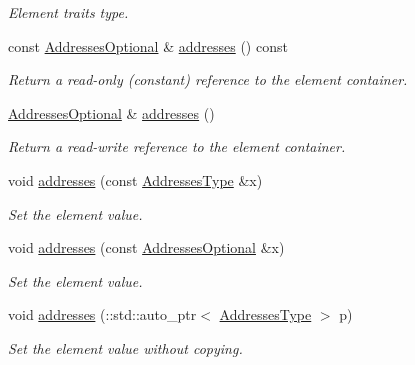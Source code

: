 \begin{DoxyCompactItemize}
\begin{DoxyCompactList}\small\item\em Element traits type. \item\end{DoxyCompactList}\item 
const \hyperlink{classopenstack_1_1xml_1_1Server_a61bfe22398061981e800f13759059fbd}{AddressesOptional} \& \hyperlink{classopenstack_1_1xml_1_1Server_a2897d8f0fab9ce57c3391f06630b902d}{addresses} () const 
\begin{DoxyCompactList}\small\item\em Return a read-\/only (constant) reference to the element container. \item\end{DoxyCompactList}\item 
\hyperlink{classopenstack_1_1xml_1_1Server_a61bfe22398061981e800f13759059fbd}{AddressesOptional} \& \hyperlink{classopenstack_1_1xml_1_1Server_a9bdb27c2a96816f796dd0ad062ff2ef4}{addresses} ()
\begin{DoxyCompactList}\small\item\em Return a read-\/write reference to the element container. \item\end{DoxyCompactList}\item 
void \hyperlink{classopenstack_1_1xml_1_1Server_a7a0485704e1c25798b0ced61a8b61448}{addresses} (const \hyperlink{classopenstack_1_1xml_1_1Addresses}{AddressesType} \&x)
\begin{DoxyCompactList}\small\item\em Set the element value. \item\end{DoxyCompactList}\item 
void \hyperlink{classopenstack_1_1xml_1_1Server_ae573745a06ad7f3bbdb1f629c55dedf5}{addresses} (const \hyperlink{classopenstack_1_1xml_1_1Server_a61bfe22398061981e800f13759059fbd}{AddressesOptional} \&x)
\begin{DoxyCompactList}\small\item\em Set the element value. \item\end{DoxyCompactList}\item 
void \hyperlink{classopenstack_1_1xml_1_1Server_a9f57ee6d39587963804b16d377aee83c}{addresses} (::std::auto\_\-ptr$<$ \hyperlink{classopenstack_1_1xml_1_1Addresses}{AddressesType} $>$ p)
\begin{DoxyCompactList}\small\item\em Set the element value without copying. \item\end{DoxyCompactList}\end{DoxyCompactItemize}
